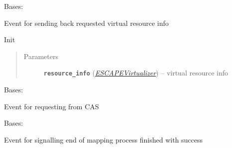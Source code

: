 \documentclass[letterpaper,10pt,english]{sphinxmanual}
\begin{document}

\begin{fulllineitems}
\label{orchest/ros_API:escape.orchest.ros_API.VirtResInfoEvent}
Bases: 

Event for sending back requested virtual resource info

\begin{fulllineitems}
\label{orchest/ros_API:escape.orchest.ros_API.VirtResInfoEvent.__init__}
Init
\begin{quote}\begin{description}
\item[{Parameters}] \leavevmode
\textbf{\texttt{resource\_info}} ({\hyperref[orchest/virtualization_mgmt:escape.orchest.virtualization_mgmt.ESCAPEVirtualizer]{\emph{\emph{ESCAPEVirtualizer}}}}) -- virtual resource info

\end{description}\end{quote}

\end{fulllineitems}


\end{fulllineitems}


\begin{fulllineitems}
\label{orchest/ros_API:escape.orchest.ros_API.GetGlobalResInfoEvent}
Bases: 

Event for requesting  from CAS

\end{fulllineitems}


\begin{fulllineitems}
\label{orchest/ros_API:escape.orchest.ros_API.InstantiationFinishedEvent}
Bases: 

Event for signalling end of mapping process finished with success

\begin{fulllineitems}
\label{orchest/ros_API:escape.orchest.ros_API.InstantiationFinishedEvent.__init__}
\end{fulllineitems}


\end{fulllineitems}
\end{document}
